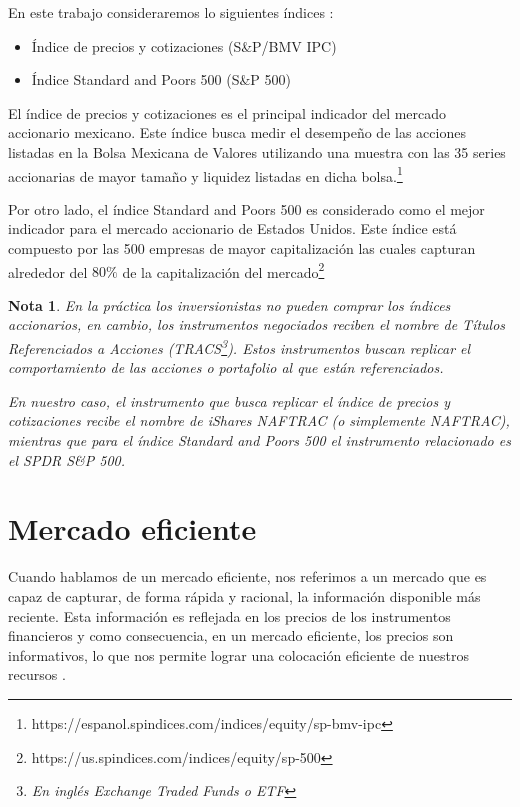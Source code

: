 \documentclass[12pt]{scrbook}
\theoremstyle{break}
\newtheorem{nota}{Nota}[chapter]
\theoremstyle{break}
\begin{document}
En este trabajo consideraremos lo siguientes índices :

\begin{itemize}
\item Índice de precios y cotizaciones (S\&P/BMV IPC)
\item Índice Standard and Poors 500 (S\&P 500)
\end{itemize}

El índice de precios y cotizaciones es el principal indicador del mercado accionario mexicano. Este índice busca medir el desempeño de las acciones listadas en la Bolsa Mexicana de Valores utilizando una muestra con las 35 series accionarias de mayor tamaño y liquidez listadas en dicha bolsa.\footnote{https://espanol.spindices.com/indices/equity/sp-bmv-ipc}

Por otro lado, el índice Standard and Poors 500 es considerado como el mejor indicador para el mercado accionario de Estados Unidos. Este índice está compuesto por las 500 empresas de mayor capitalización las cuales capturan alrededor del $80\%$ de la capitalización del mercado\footnote{https://us.spindices.com/indices/equity/sp-500}

\begin{nota} \label{nota:ETF}
En la práctica los inversionistas no pueden comprar los índices accionarios, en cambio, los instrumentos negociados reciben el nombre de Títulos Referenciados a Acciones (TRACS\footnote{En inglés Exchange Traded Funds o ETF}). Estos instrumentos buscan replicar el comportamiento de las acciones o portafolio al que están referenciados.

En nuestro caso, el instrumento que busca replicar el índice de precios y cotizaciones recibe el nombre de iShares NAFTRAC (o simplemente NAFTRAC), mientras que para el índice Standard and Poors 500 el instrumento relacionado es el SPDR S\&P 500.
\end{nota}

\section{Mercado eficiente}
\label{seccion:mercado eficiente}
Cuando hablamos de un mercado eficiente, nos referimos a un mercado que es capaz de capturar, de forma rápida y racional, la información disponible más reciente. Esta información es reflejada en los precios de los instrumentos financieros y como consecuencia, en un mercado eficiente, los precios son informativos, lo que nos permite lograr una colocación eficiente de nuestros recursos \cite{CFA2019}.
\end{document}
